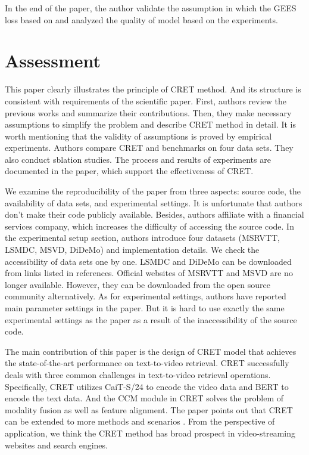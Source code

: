 \documentclass{article}
\begin{document}
In the end of the paper, the author validate the assumption in which the GEES loss based on and analyzed the quality of model based on the experiments.
\section{Assessment}
This paper clearly illustrates the principle of CRET method. And its structure is consistent with requirements of the scientific paper. First, authors review the previous works and summarize their contributions. Then, they make necessary assumptions to simplify the problem and describe CRET method in detail. It is worth mentioning that the validity of assumptions is proved by empirical experiments. Authors compare CRET and benchmarks on four data sets. They also conduct sblation studies. The process and results of experiments are documented in the paper, which support the effectiveness of CRET.

We examine the reproducibility of the paper from three aspects: source code, the availability of data sets, and experimental settings. It is unfortunate that authors don't make their code publicly available. Besides, authors affiliate with a financial services company, which increases the difficulty of accessing the source code. In the experimental setup section, authors introduce four datasets (MSRVTT, LSMDC, MSVD, DiDeMo) and implementation details. We check the accessibility of data sets one by one. LSMDC and DiDeMo can be downloaded from links listed in references. Official websites of MSRVTT and MSVD are no longer available. However, they can be downloaded from the open source community alternatively. As for experimental settings, authors have reported main parameter settings in the paper. But it is hard to use exactly the same experimental settings as the paper as a result of the inaccessibility of the source code.

The main contribution of this paper is the design of CRET model that achieves the state-of-the-art performance on text-to-video retrieval. CRET successfully deals with three common challenges in text-to-video retrieval operations. Specifically, CRET utilizes CaiT-S/24 to encode the video data and BERT to encode the text data. And the CCM module in CRET solves the problem of modality fusion as well as feature alignment. The paper points out that CRET can be extended to more methods and scenarios \cite{cret}. From the perspective of application, we think the CRET method has broad prospect in video-streaming websites and search engines.
\end{document}
